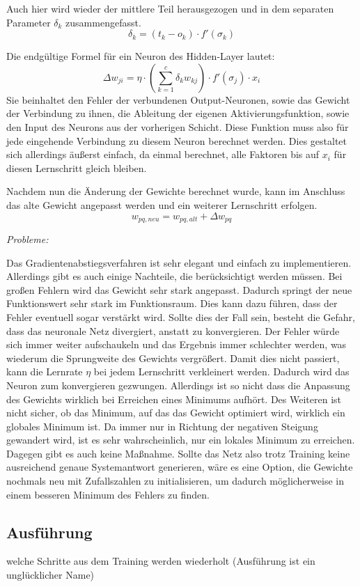 Auch hier wird wieder der mittlere Teil herausgezogen und in dem separaten Parameter $\delta_k$ zusammengefasst.
\begin{equation}
\delta_k = (t_k-o_k)\cdot f'(\sigma_k)
\end{equation}

Die endgültige Formel für ein Neuron des Hidden-Layer lautet:
\begin{equation}
\Delta w_{ji}=\eta \cdot \left(\sum_{k=1}^{c} \delta_k w_{kj}\right)\cdot f'(\sigma_j)\cdot x_i
\end{equation}
Sie beinhaltet den Fehler der verbundenen Output-Neuronen, sowie das Gewicht der Verbindung zu ihnen, die Ableitung der eigenen Aktivierungsfunktion, sowie den Input des Neurons aus der vorherigen Schicht. Diese Funktion muss also für jede eingehende Verbindung zu diesem Neuron berechnet werden. Dies gestaltet sich allerdings äußerst einfach, da einmal berechnet, alle Faktoren bis auf $x_i$ für diesen Lernschritt gleich bleiben.

Nachdem nun die Änderung der Gewichte berechnet wurde, kann im Anschluss das alte Gewicht angepasst werden und ein weiterer Lernschritt erfolgen.
\begin{equation}
w_{pq, neu}=w_{pq, alt}+\Delta w_{pq}
\end{equation}

\emph{Probleme:}

Das Gradientenabstiegsverfahren ist sehr elegant und einfach zu implementieren. Allerdings gibt es auch einige Nachteile, die berücksichtigt werden müssen. Bei großen Fehlern wird das Gewicht sehr stark angepasst. Dadurch springt der neue Funktionswert sehr stark im Funktionsraum. Dies kann dazu führen, dass der Fehler eventuell sogar verstärkt wird. Sollte dies der Fall sein, besteht die Gefahr, dass das neuronale Netz divergiert, anstatt zu konvergieren. Der Fehler würde sich immer weiter aufschaukeln und das Ergebnis immer schlechter werden, was wiederum die Sprungweite des Gewichts vergrößert. Damit dies nicht passiert, kann die Lernrate $\eta$ bei jedem Lernschritt verkleinert werden. Dadurch wird das Neuron zum konvergieren gezwungen. Allerdings ist so nicht dass die Anpassung des Gewichts wirklich bei Erreichen eines Minimums aufhört. 
Des Weiteren ist nicht sicher, ob das Minimum, auf das das Gewicht optimiert wird, wirklich ein globales Minimum ist. Da immer nur in Richtung der negativen Steigung gewandert wird, ist es sehr wahrscheinlich, nur ein lokales Minimum zu erreichen. Dagegen gibt es auch keine Maßnahme. Sollte das Netz also trotz Training keine ausreichend genaue Systemantwort generieren, wäre es eine Option, die Gewichte nochmals neu mit Zufallszahlen zu initialisieren, um dadurch möglicherweise in einem besseren Minimum des Fehlers zu finden.




\subsection{Ausführung}
welche Schritte aus dem Training werden wiederholt
(Ausführung ist ein unglücklicher Name)